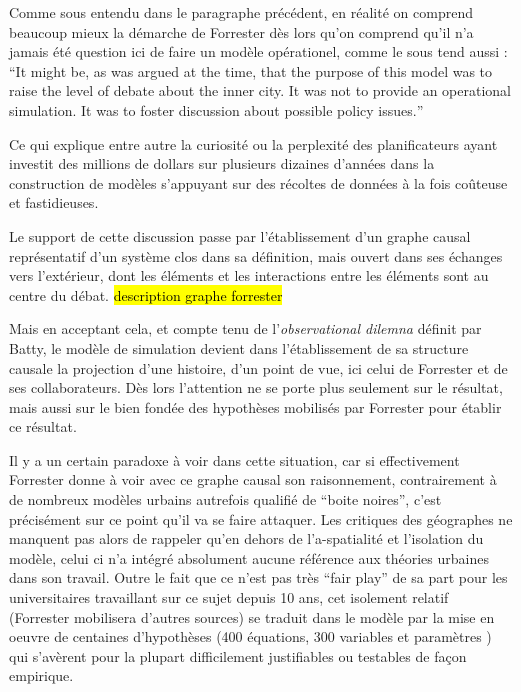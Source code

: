 Comme sous entendu dans le paragraphe précédent, en réalité on comprend beaucoup mieux la démarche de Forrester dès lors qu'on comprend qu'il n'a jamais été question ici de faire un modèle opérationel, comme le sous tend aussi \autocite{Batty2001} : \foreignquote{english}{It might be, as was argued at the time, that the purpose of this model was to raise the level of debate about the inner city. It was not to provide an operational simulation. It was to foster discussion about possible policy issues.}

Ce qui explique entre autre la curiosité ou la perplexité des planificateurs \autocite{Lee1973} ayant investit des millions de dollars sur plusieurs dizaines d'années dans la construction de modèles s'appuyant sur des récoltes de données à la fois coûteuse et fastidieuses.

Le support de cette discussion passe par l'établissement d'un graphe causal représentatif d'un système clos dans sa définition, mais ouvert dans ses échanges vers l'extérieur, dont les éléments et les interactions entre les éléments sont au centre du débat. \hl{description graphe forrester}

Mais en acceptant cela, et compte tenu de l'\textit{observational dilemna} définit par Batty, le modèle de simulation devient dans l'établissement de sa structure causale la projection d'une histoire, d'un point de vue, ici celui de Forrester et de ses collaborateurs. Dès lors l'attention ne se porte plus seulement sur le résultat, mais aussi sur le bien fondée des hypothèses mobilisés par Forrester pour établir ce résultat.

Il y a un certain paradoxe à voir dans cette situation, car si effectivement Forrester donne à voir avec ce graphe causal son raisonnement, contrairement à de nombreux modèles urbains autrefois qualifié de \enquote{boite noires}, c'est précisément sur ce point qu'il va se faire attaquer. Les critiques des géographes ne manquent pas alors de rappeler qu'en dehors de l'a-spatialité et l'isolation du modèle, celui ci n'a intégré absolument aucune référence aux théories urbaines dans son travail. Outre le fait que ce n'est pas très \enquote{fair play} de sa part pour les universitaires travaillant sur ce sujet depuis 10 ans, cet isolement relatif (Forrester mobilisera d'autres sources) se traduit dans le modèle par la mise en oeuvre de centaines d'hypothèses (400 équations, 300 variables et paramètres \autocite[63]{Pumain1989}) qui s'avèrent pour la plupart difficilement justifiables ou testables de façon empirique. \autocite[307]{Batty1976}

